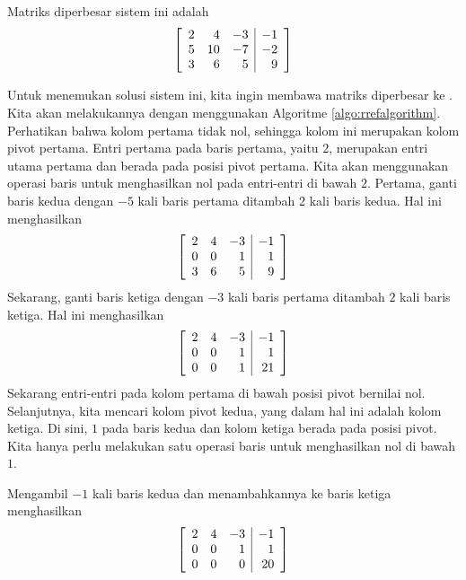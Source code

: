 \begin{solution} Matriks diperbesar sistem ini adalah
\begin{equation*}
\left[
\begin{array}{rrr|r}
2 & 4  & -3 & -1 \\
5 & 10 & -7 & -2 \\
3 & 6  &  5 &  9
\end{array}
\right]
\end{equation*}

Untuk menemukan solusi sistem ini, kita ingin membawa matriks diperbesar ke \rref.
Kita akan melakukannya dengan menggunakan Algoritme \ref{algo:rrefalgorithm}. Perhatikan bahwa
kolom pertama tidak nol, sehingga kolom ini merupakan kolom pivot pertama. Entri pertama pada baris pertama, yaitu $2$, merupakan
entri utama pertama dan berada pada posisi pivot pertama. Kita akan menggunakan operasi baris
untuk menghasilkan nol pada entri-entri di bawah $2$. Pertama, ganti baris kedua dengan $-5$ kali baris pertama ditambah $2$ kali baris kedua. Hal ini menghasilkan
\begin{equation*}
\left[
\begin{array}{rrr|r}
2 & 4 & -3 & -1 \\
0 & 0 & 1 & 1 \\
3 & 6 & 5 & 9
\end{array}
\right]
\end{equation*}
Sekarang, ganti baris ketiga dengan $-3$ kali baris pertama
ditambah $2$ kali baris ketiga. Hal ini menghasilkan
\begin{equation*}
\left[
\begin{array}{rrr|r}
2 & 4 & -3 &  -1 \\
0 & 0 & 1 & 1 \\
0 & 0 & 1 & 21
\end{array}
\right] 
\end{equation*}
Sekarang entri-entri pada kolom pertama di bawah posisi pivot bernilai nol. Selanjutnya, kita mencari kolom pivot kedua, yang dalam hal ini adalah kolom ketiga.
Di sini, $1$ pada baris kedua dan kolom ketiga berada pada posisi pivot.
Kita hanya perlu melakukan satu operasi baris untuk menghasilkan nol di bawah $1$.

Mengambil $-1$ kali baris kedua dan
menambahkannya ke baris ketiga menghasilkan
\begin{equation*}
\left[
\begin{array}{rrr|r}
2 & 4 & -3 & -1 \\
0 & 0 &  1 & 1 \\
0 & 0 &  0 & 20
\end{array}
\right] 
\end{equation*}


\end{solution}
